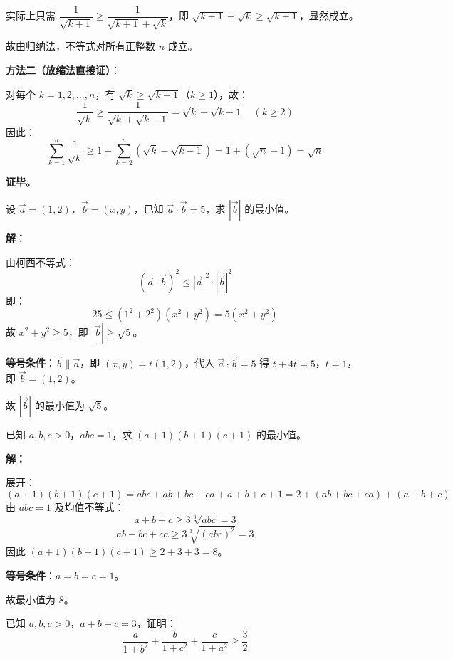 \documentclass[12pt, a4paper]{ctexart}
\begin{document}
实际上只需 $\dfrac{1}{\sqrt{k+1}} \geqslant \dfrac{1}{\sqrt{k+1}+\sqrt{k}}$，即 $\sqrt{k+1}+\sqrt{k} \geqslant \sqrt{k+1}$，显然成立。

故由归纳法，不等式对所有正整数 $n$ 成立。

\textbf{方法二（放缩法直接证）}：

对每个 $k=1,2,\ldots,n$，有 $\sqrt{k} \geqslant \sqrt{k-1}$（$k \geqslant 1$），故：
\[
\frac{1}{\sqrt{k}} \geqslant \frac{1}{\sqrt{k}+\sqrt{k-1}} = \sqrt{k}-\sqrt{k-1} \quad (k \geqslant 2)
\]
因此：
\[
\sum_{k=1}^{n}\frac{1}{\sqrt{k}} \geqslant 1 + \sum_{k=2}^{n}(\sqrt{k}-\sqrt{k-1}) = 1 + (\sqrt{n}-1) = \sqrt{n}
\]

\textbf{证毕。}

\begin{examplebox}[【例题10】柯西不等式解决向量模长问题]
设 $\vec{a}=(1,2)$，$\vec{b}=(x,y)$，已知 $\vec{a}\cdot\vec{b}=5$，求 $|\vec{b}|$ 的最小值。
\end{examplebox}

\textbf{解：}

由柯西不等式：
\[
(\vec{a}\cdot\vec{b})^2 \leqslant |\vec{a}|^2 \cdot |\vec{b}|^2
\]
即：
\[
25 \leqslant (1^2+2^2)(x^2+y^2) = 5(x^2+y^2)
\]
故 $x^2+y^2 \geqslant 5$，即 $|\vec{b}| \geqslant \sqrt{5}$。

\textbf{等号条件}：$\vec{b} \parallel \vec{a}$，即 $(x,y) = t(1,2)$，代入 $\vec{a}\cdot\vec{b}=5$ 得 $t+4t=5$，$t=1$，即 $\vec{b}=(1,2)$。

故 $|\vec{b}|$ 的最小值为 $\boxed{\sqrt{5}}$。

\begin{examplebox}[【例题11】均值不等式的多变量应用]
已知 $a,b,c>0$，$abc=1$，求 $(a+1)(b+1)(c+1)$ 的最小值。
\end{examplebox}

\textbf{解：}

展开：
\[
(a+1)(b+1)(c+1) = abc+ab+bc+ca+a+b+c+1 = 2+(ab+bc+ca)+(a+b+c)
\]
由 $abc=1$ 及均值不等式：
\[
a+b+c \geqslant 3\sqrt[3]{abc} = 3
\]
\[
ab+bc+ca \geqslant 3\sqrt[3]{(abc)^2} = 3
\]
因此 $(a+1)(b+1)(c+1) \geqslant 2+3+3 = 8$。

\textbf{等号条件}：$a=b=c=1$。

故最小值为 $\boxed{8}$。

\begin{examplebox}
已知 $a,b,c>0$，$a+b+c=3$，证明：
\[
\frac{a}{1+b^2}+\frac{b}{1+c^2}+\frac{c}{1+a^2} \geqslant \frac{3}{2}
\]
\end{examplebox}
\end{document}
